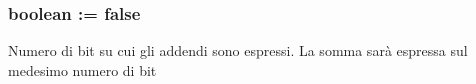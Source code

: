 \subsubsection[{\texorpdfstring{use\+\_\+custom}{use_custom}}]{ {\bfseries \textcolor{vhdlchar}{ }} {\bfseries \textcolor{vhdlchar}{boolean}\textcolor{vhdlchar}{ }\textcolor{vhdlchar}{ }\textcolor{vhdlchar}{\+:}\textcolor{vhdlchar}{=}\textcolor{vhdlchar}{ }\textcolor{vhdlchar}{ }\textcolor{vhdlchar}{ }\textcolor{vhdlchar}{ }\textcolor{vhdlchar}{false}\textcolor{vhdlchar}{ }} \hspace{0.3cm}{\ttfamily [Generic]}}\hypertarget{group___adder_gadf05ca347ec6d3c85740dc697469b3db}{}\label{group___adder_gadf05ca347ec6d3c85740dc697469b3db}
Numero di bit su cui gli addendi sono espressi. La somma sarà espressa sul medesimo numero di bit 